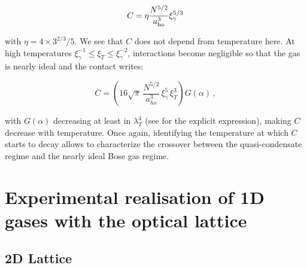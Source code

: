 \begin{equation}
    C = \eta \frac{N^{5/2}}{a_{\rm{ho}}^3} \xi_\gamma^{5/3} 
    \label{eq:weak_int_lowT}
\end{equation}

\noindent with $\eta = 4 \times 3^{2/3}/5$. We see that $C$ does not depend from temperature here. At high temperatures $\xi_\gamma^{-1} \leq \xi_T \leq \xi_\gamma^{-2}$, interactions become negligible so that the gas is nearly ideal and the contact writes:

\begin{equation}
    C = \left( 16 \sqrt{\pi} \, \frac{N^{5/2}}{a_{ho}^3} \, \xi_\gamma^5 \, \xi_T^3 \right) G(\alpha) \, ,
    \label{eq:weak_int_highT}
\end{equation}

\noindent with $G(\alpha)$ decreasing at least in $\lambda_T^4$ (see \cite{yao2018tan} for the explicit expression), making $C$ decrease with temperature. Once again, identifying the temperature at which $C$ starts to decay allows to characterize the crossover between the quasi-condensate regime and the nearly ideal Bose gas regime.

\section{Experimental realisation of 1D gases with the optical lattice}

\label{sec:1D_exp}

\subsection{2D Lattice}

